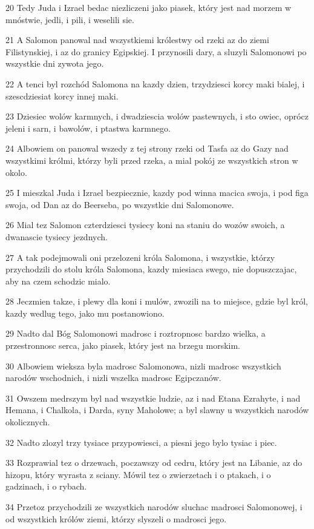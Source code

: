 \par 20 Tedy Juda i Izrael bedac niezliczeni jako piasek, który jest nad morzem w mnóstwie, jedli, i pili, i weselili sie.
\par 21 A Salomon panowal nad wszystkiemi królestwy od rzeki az do ziemi Filistynskiej, i az do granicy Egipskiej. I przynosili dary, a sluzyli Salomonowi po wszystkie dni zywota jego.
\par 22 A tenci byl rozchód Salomona na kazdy dzien, trzydziesci korcy maki bialej, i szescdziesiat korcy innej maki.
\par 23 Dziesiec wolów karmnych, i dwadziescia wolów pastewnych, i sto owiec, oprócz jeleni i sarn, i bawolów, i ptastwa karmnego.
\par 24 Albowiem on panowal wszedy z tej strony rzeki od Tasfa az do Gazy nad wszystkimi królmi, którzy byli przed rzeka, a mial pokój ze wszystkich stron w okolo.
\par 25 I mieszkal Juda i Izrael bezpiecznie, kazdy pod winna macica swoja, i pod figa swoja, od Dan az do Beerseba, po wszystkie dni Salomonowe.
\par 26 Mial tez Salomon czterdziesci tysiecy koni na staniu do wozów swoich, a dwanascie tysiecy jezdnych.
\par 27 A tak podejmowali oni przelozeni króla Salomona, i wszystkie, którzy przychodzili do stolu króla Salomona, kazdy miesiaca swego, nie dopuszczajac, aby na czem schodzic mialo.
\par 28 Jeczmien takze, i plewy dla koni i mulów, zwozili na to miejsce, gdzie byl król, kazdy wedlug tego, jako mu postanowiono.
\par 29 Nadto dal Bóg Salomonowi madrosc i roztropnosc bardzo wielka, a przestronnosc serca, jako piasek, który jest na brzegu morskim.
\par 30 Albowiem wieksza byla madrosc Salomonowa, nizli madrosc wszystkich narodów wschodnich, i nizli wszelka madrosc Egipczanów.
\par 31 Owszem medrszym byl nad wszystkie ludzie, az i nad Etana Ezrahyte, i nad Hemana, i Chalkola, i Darda, syny Maholowe; a byl slawny u wszystkich narodów okolicznych.
\par 32 Nadto zlozyl trzy tysiace przypowiesci, a piesni jego bylo tysiac i piec.
\par 33 Rozprawial tez o drzewach, poczawszy od cedru, który jest na Libanie, az do hizopu, który wyrasta z sciany. Mówil tez o zwierzetach i o ptakach, i o gadzinach, i o rybach.
\par 34 Przetoz przychodzili ze wszystkich narodów sluchac madrosci Salomonowej, i od wszystkich królów ziemi, którzy slyszeli o madrosci jego.

